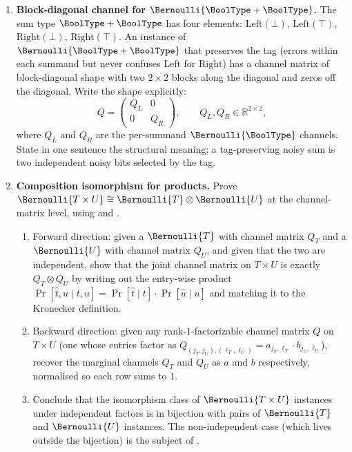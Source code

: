 \begin{enumerate}
\item \exstar
\label{ex:ch13-3}
\textbf{Block-diagonal channel for $\Bernoulli{\BoolType + \BoolType}$.}
The sum type $\BoolType + \BoolType$ has four elements:
$\mathrm{Left}(\bot)$, $\mathrm{Left}(\top)$, $\mathrm{Right}(\bot)$,
$\mathrm{Right}(\top)$. An instance of
$\Bernoulli{\BoolType + \BoolType}$ that preserves the tag (errors
within each summand but never confuses $\mathrm{Left}$ for
$\mathrm{Right}$) has a channel matrix of block-diagonal shape with
two $2 \times 2$ blocks along the diagonal and zeros off the
diagonal. Write the shape explicitly:
\[
  Q = \begin{pmatrix} Q_L & 0 \\ 0 & Q_R \end{pmatrix},
  \qquad Q_L, Q_R \in \mathbb{R}^{2 \times 2},
\]
where $Q_L$ and $Q_R$ are the per-summand $\Bernoulli{\BoolType}$
channels. State in one sentence the structural meaning: a
tag-preserving noisy sum is two independent noisy bits selected by
the tag.


\item \exstarstar
\label{ex:ch13-4}
\textbf{Composition isomorphism for products.}
Prove $\Bernoulli{T \times U} \cong \Bernoulli{T} \otimes
\Bernoulli{U}$ at the channel-matrix level, using
 and .
\begin{enumerate}
  \item[(a)] Forward direction: given a $\Bernoulli{T}$ with channel
    matrix $Q_T$ and a $\Bernoulli{U}$ with channel matrix $Q_U$,
    and given that the two are independent, show that the joint
    channel matrix on $T \times U$ is exactly $Q_T \otimes Q_U$
    by writing out the entry-wise product
    $\Pr[\hat t, \hat u \mid t, u] = \Pr[\hat t \mid t]
    \cdot \Pr[\hat u \mid u]$ and matching it to the Kronecker
    definition.
  \item[(b)] Backward direction: given any rank-$1$-factorizable
    channel matrix $Q$ on $T \times U$ (one whose entries factor as
    $Q_{(j_T, j_U), (\ell_T, \ell_U)} = a_{j_T, \ell_T} \cdot
    b_{j_U, \ell_U}$), recover the marginal channels $Q_T$ and $Q_U$
    as $a$ and $b$ respectively, normalised so each row sums to $1$.
  \item[(c)] Conclude that the isomorphism class of
    $\Bernoulli{T \times U}$ instances under independent factors is
    in bijection with pairs of $\Bernoulli{T}$ and $\Bernoulli{U}$
    instances. The non-independent case (which lives outside the
    bijection) is the subject of .
\end{enumerate}


\end{enumerate}
